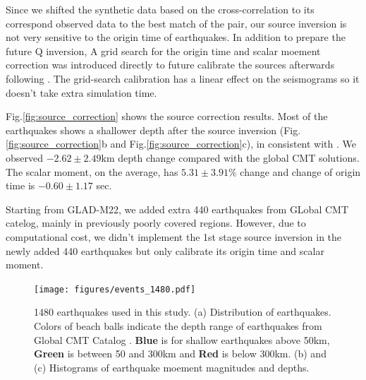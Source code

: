 \documentclass[extra,mreferee]{gji}
\begin{document}
Since we shifted the synthetic data based on the cross-correlation to its correspond observed
data to the best match of the pair, our source inversion is not very sensitive to
the origin time of earthquakes. In addition to prepare the future Q inversion,
A grid search for the origin time and scalar moement correction was introduced
directly to future calibrate the sources afterwards following \cite{zhu2012structure}.
The grid-search calibration has a linear effect on the seismograms so it doesn't take extra
simulation time.

Fig.\ref{fig:source_correction} shows the source correction results.
Most of the earthquakes shows a shallower depth after the source inversion
(Fig.\ref{fig:source_correction}b and Fig.\ref{fig:source_correction}c),
in consistent with \cite{hjorleifsdottir2010effects}.
We observed $-2.62\pm2.49$km depth change compared with the global CMT solutions.
The scalar moment, on the average, has $5.31\pm3.91$\% change and change of origin time
is $-0.60\pm1.17$ sec.

Starting from GLAD-M22, we added extra 440 earthquakes from GLobal CMT catelog,
mainly in previously poorly covered regions. However, due to computational cost,
we didn't implement the 1st stage source inversion in the newly added 440
earthquakes but only calibrate its origin time and scalar moment.

\begin{figure}
  \centering
  \texttt{[image: figures/events\_1480.pdf]}
  \caption{1480 earthquakes used in this study. (a) Distribution of earthquakes. Colors of beach balls indicate the depth range of earthquakes from Global CMT Catalog \citep{ekstrom2012global}. {\textbf{\color{Blue} Blue}} is for shallow earthquakes above 50km, \textbf{{\color{ForestGreen} Green}} is between 50 and 300km and \textbf{{\color{Red} Red}} is below 300km. (b) and (c) Histograms of earthquake moement magnitudes and depths.}
  \label{fig:event_1480}
\end{figure}
\end{document}
